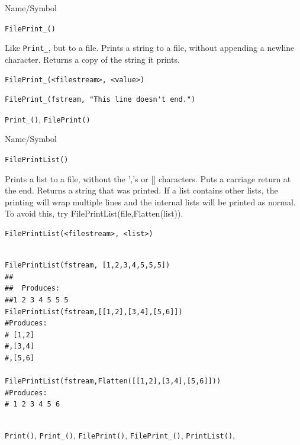 \begin{desc}{Name/Symbol}
\item[Name/Symbol]	\verb+FilePrint_()+

\item[Description]	Like \verb+Print_+, but to a file.  Prints a
  string to a file,	without appending a newline character.  Returns a
  copy of the string it prints.
	
\item[Usage]
\begin{verbatim}
FilePrint_(<filestream>, <value>)
\end{verbatim}

\item[Example]
\begin{verbatim}
FilePrint_(fstream, "This line doesn't end.")
\end{verbatim}

\item[See Also]	\verb+Print_()+, \verb+FilePrint()+
\end{desc}


\begin{desc}{Name/Symbol}
\item[Name/Symbol]	\verb+FilePrintList()+

\item[Description]	Prints a list to a file, without the ','s or []
  characters. Puts a carriage return at the end.  Returns a string
  that was printed.  If a list contains other lists, the printing will
  wrap multiple lines and the internal lists will be printed as
  normal.  To avoid this, try FilePrintList(file,Flatten(list)).

\item[Usage]
\begin{verbatim}
FilePrintList(<filestream>, <list>)
\end{verbatim}

\item[Example]
\begin{verbatim}

FilePrintList(fstream, [1,2,3,4,5,5,5])
##
##  Produces:
##1 2 3 4 5 5 5
FilePrintList(fstream,[[1,2],[3,4],[5,6]])
#Produces:
# [1,2]
#,[3,4]
#,[5,6]

FilePrintList(fstream,Flatten([[1,2],[3,4],[5,6]]))
#Produces:
# 1 2 3 4 5 6


\end{verbatim}

\item[See Also]	\verb+Print()+, \verb+Print_()+, \verb+FilePrint()+, \verb+FilePrint_()+, \verb+PrintList()+,
\end{desc}




